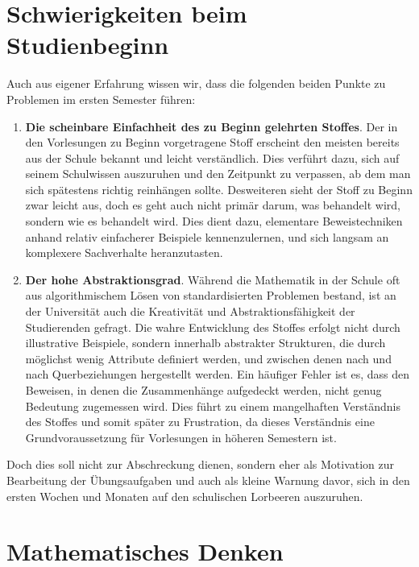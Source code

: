 \section{Schwierigkeiten beim Studienbeginn}
Auch aus eigener Erfahrung wissen wir, dass die folgenden beiden Punkte zu
Problemen im ersten Semester führen:
\begin{enumerate}
    \item
    \textbf{Die scheinbare Einfachheit des zu Beginn gelehrten Stoffes}.
    Der in den Vorlesungen zu Beginn vorgetragene Stoff erscheint den meisten bereits aus der Schule bekannt
    und leicht verständlich. Dies verführt dazu, sich auf seinem Schulwissen auszuruhen und den Zeitpunkt zu verpassen,
    ab dem man sich spätestens richtig reinhängen sollte. Desweiteren sieht der Stoff zu Beginn zwar leicht aus, doch es geht
    auch nicht primär darum, was behandelt wird, sondern wie es behandelt wird. Dies dient dazu, elementare Beweistechniken
    anhand relativ einfacherer Beispiele kennenzulernen, und sich langsam an komplexere Sachverhalte heranzutasten.
    \item
    \textbf{Der hohe Abstraktionsgrad}. Während die Mathematik in der Schule oft aus algorithmischem Lösen von standardisierten
    Problemen bestand, ist an der Universität auch die Kreativität und Abstraktionsfähigkeit der Studierenden gefragt.
    Die wahre Entwicklung des Stoffes erfolgt nicht durch illustrative Beispiele, sondern innerhalb abstrakter Strukturen, die durch
    möglichst wenig Attribute definiert werden, und zwischen denen nach und nach Querbeziehungen hergestellt werden.
    Ein häufiger Fehler ist es, dass den Beweisen, in denen die Zusammenhänge aufgedeckt werden, nicht genug Bedeutung zugemessen wird.
    Dies führt zu einem mangelhaften Verständnis des Stoffes und somit später zu Frustration, da dieses Verständnis eine Grundvoraussetzung
    für Vorlesungen in höheren Semestern ist.
\end{enumerate}
Doch dies soll nicht zur Abschreckung dienen, sondern eher als Motivation zur
Bearbeitung der Übungsaufgaben und auch als kleine Warnung davor, sich in den
ersten Wochen und Monaten auf den schulischen Lorbeeren auszuruhen.

\section{Mathematisches Denken}

